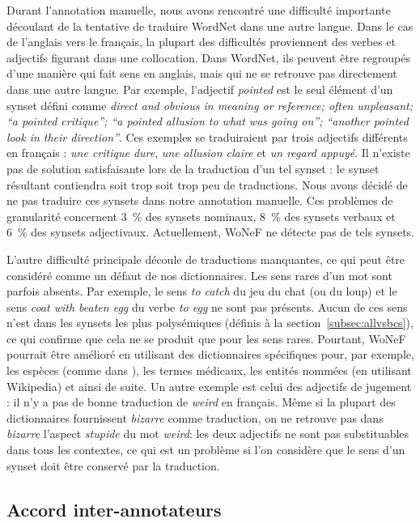 Durant l'annotation manuelle, nous avons rencontré une difficulté importante
découlant de la tentative de traduire WordNet dans une autre langue. Dans le
cas de l'anglais vers le français, la plupart des difficultés proviennent des
verbes et adjectifs figurant dans une collocation. Dans WordNet, ils peuvent
être regroupés d'une manière qui fait sens en anglais, mais qui ne se retrouve
pas directement dans une autre langue. Par exemple, l'adjectif \textit{pointed}
est le seul élément d'un synset défini comme \textit{direct and obvious in
meaning or reference; often unpleasant; ``a pointed critique''; ``a pointed
allusion to what was going on''; ``another pointed look in their direction''}.
Ces exemples se traduiraient par trois adjectifs différents en français :
\textit{une critique dure}, \textit{une allusion claire} et \textit{un regard
appuyé}. Il n'existe pas de solution satisfaisante lors de la traduction d'un
tel synset : le synset résultant contiendra soit trop soit trop peu de
traductions. Nous avons décidé de ne pas traduire ces synsets dans notre
annotation manuelle. Ces problèmes de granularité concernent 3~\% des synsets
nominaux, 8~\% des synsets verbaux et 6~\% des synsets adjectivaux.
Actuellement, WoNeF ne détecte pas de tels synsets.

L'autre difficulté principale découle de traductions manquantes, ce qui peut
être considéré comme un défaut de nos dictionnaires. Les sens rares d'un mot
sont parfois absents. Par exemple, le sens \textit{to catch} du jeu du chat (ou
du loup) et le sens \textit{coat with beaten egg} du verbe \textit{to egg} ne
sont pas présents. Aucun de ces sens n'est dans les synsets les plus
polysémiques (définis à la section~\ref{subsec:allvsbcs}), ce qui confirme que
cela ne se produit que pour les sens rares. Pourtant, WoNeF pourrait être
amélioré en utilisant des dictionnaires spécifiques pour, par exemple, les
espèces (comme dans \cite{sagot2008construction}), les termes médicaux, les
entités nommées (en utilisant Wikipedia) et ainsi de suite. Un autre exemple
est celui des adjectifs de jugement : il n'y a pas de bonne traduction de
\textit{weird} en français. Même si la plupart des dictionnaires fournissent
\textit{bizarre} comme traduction, on ne retrouve pas dans \textit{bizarre}
l'aspect \textit{stupide} du mot \textit{weird}: les deux adjectifs ne sont pas
substituables dans tous les contextes, ce qui est un problème si l'on considère
que le sens d'un synset doit être conservé par la traduction.

\subsection{Accord inter-annotateurs}
\label{subsec:interannotator_agreement}

